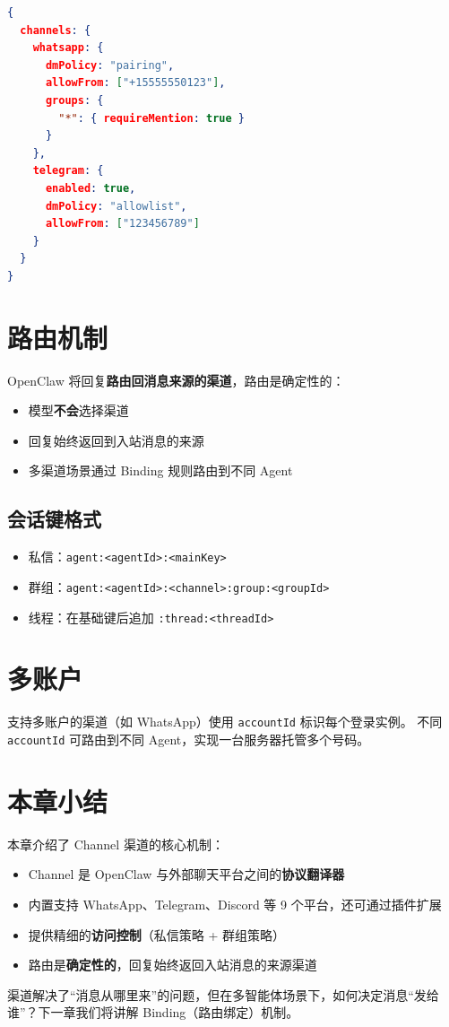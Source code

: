 \begin{lstlisting}[language=json]
{
  channels: {
    whatsapp: {
      dmPolicy: "pairing",
      allowFrom: ["+15555550123"],
      groups: {
        "*": { requireMention: true }
      }
    },
    telegram: {
      enabled: true,
      dmPolicy: "allowlist",
      allowFrom: ["123456789"]
    }
  }
}
\end{lstlisting}

\section{路由机制}

OpenClaw 将回复\textbf{路由回消息来源的渠道}，路由是确定性的：

\begin{itemize}
  \item 模型\textbf{不会}选择渠道
  \item 回复始终返回到入站消息的来源
  \item 多渠道场景通过 Binding 规则路由到不同 Agent
\end{itemize}

\subsection{会话键格式}

\begin{itemize}
  \item 私信：\texttt{agent:<agentId>:<mainKey>}
  \item 群组：\texttt{agent:<agentId>:<channel>:group:<groupId>}
  \item 线程：在基础键后追加 \texttt{:thread:<threadId>}
\end{itemize}

\section{多账户}

支持多账户的渠道（如 WhatsApp）使用 \texttt{accountId} 标识每个登录实例。
不同 \texttt{accountId} 可路由到不同 Agent，实现一台服务器托管多个号码。

\section{本章小结}

本章介绍了 Channel 渠道的核心机制：

\begin{itemize}
  \item Channel 是 OpenClaw 与外部聊天平台之间的\textbf{协议翻译器}
  \item 内置支持 WhatsApp、Telegram、Discord 等 9 个平台，还可通过插件扩展
  \item 提供精细的\textbf{访问控制}（私信策略 + 群组策略）
  \item 路由是\textbf{确定性的}，回复始终返回入站消息的来源渠道
\end{itemize}

\noindent 渠道解决了“消息从哪里来”的问题，但在多智能体场景下，如何决定消息“发给谁”？下一章我们将讲解 Binding（路由绑定）机制。
